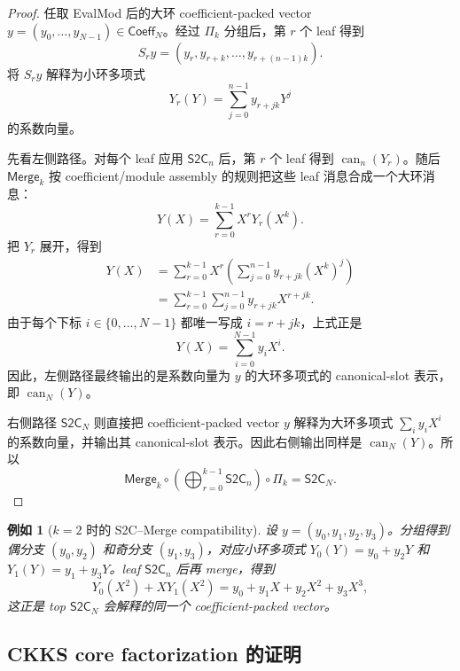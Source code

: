\documentclass[UTF8,11pt]{article}
\newcommand{\Merge}{\mathsf{Merge}}
\newcommand{\StwoC}{\mathsf{S2C}}
\theoremstyle{definition}
\theoremstyle{plain}
\newtheorem{example}{例如}
\begin{document}
\begin{proof}
任取 EvalMod 后的大环 coefficient-packed vector \(y=(y_0,\ldots,y_{N-1})\in\mathsf{Coeff}_N\)。经过 \(\Pi_k\) 分组后，第 \(r\) 个 leaf 得到
\[
S_ry=(y_r,y_{r+k},\ldots,y_{r+(n-1)k}).
\]
将 \(S_ry\) 解释为小环多项式
\[
Y_r(Y)=\sum_{j=0}^{n-1}y_{r+jk}Y^j
\]
的系数向量。

先看左侧路径。对每个 leaf 应用 \(\StwoC_n\) 后，第 \(r\) 个 leaf 得到 \(\operatorname{can}_n(Y_r)\)。随后 \(\Merge_k\) 按 coefficient/module assembly 的规则把这些 leaf 消息合成一个大环消息：
\[
Y(X)=\sum_{r=0}^{k-1}X^rY_r(X^k).
\]
把 \(Y_r\) 展开，得到
\[
\begin{aligned}
Y(X)
&=
\sum_{r=0}^{k-1}X^r
\left(
\sum_{j=0}^{n-1}y_{r+jk}(X^k)^j
\right)\\
&=
\sum_{r=0}^{k-1}
\sum_{j=0}^{n-1}
y_{r+jk}X^{r+jk}.
\end{aligned}
\]
由于每个下标 \(i\in\{0,\ldots,N-1\}\) 都唯一写成 \(i=r+jk\)，上式正是
\[
Y(X)=\sum_{i=0}^{N-1}y_iX^i.
\]
因此，左侧路径最终输出的是系数向量为 \(y\) 的大环多项式的 canonical-slot 表示，即 \(\operatorname{can}_N(Y)\)。

右侧路径 \(\StwoC_N\) 则直接把 coefficient-packed vector \(y\) 解释为大环多项式 \(\sum_i y_iX^i\) 的系数向量，并输出其 canonical-slot 表示。因此右侧输出同样是 \(\operatorname{can}_N(Y)\)。所以
\[
\Merge_k\circ
\left(\bigoplus_{r=0}^{k-1}\StwoC_n\right)
\circ\Pi_k
=
\StwoC_N.
\]
\end{proof}

\begin{example}[\(k=2\) 时的 S2C--Merge compatibility]
设 \(y=(y_0,y_1,y_2,y_3)\)。分组得到偶分支 \((y_0,y_2)\) 和奇分支 \((y_1,y_3)\)，对应小环多项式 \(Y_0(Y)=y_0+y_2Y\) 和 \(Y_1(Y)=y_1+y_3Y\)。leaf \(\StwoC_n\) 后再 merge，得到
\[
Y_0(X^2)+XY_1(X^2)
=
y_0+y_1X+y_2X^2+y_3X^3,
\]
这正是 top \(\StwoC_N\) 会解释的同一个 coefficient-packed vector。
\end{example}

\subsection{CKKS core factorization 的证明}
\label{subsec:proof-ckks-core}
\end{document}
